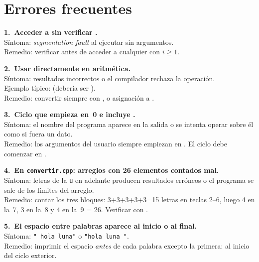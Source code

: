 \documentclass[12pt, oneside]{article}
\begin{document}
\section{Errores frecuentes}

\begin{notaprofesor}

  \textbf{1.\ Acceder a  sin verificar .}\\
  Síntoma: \textit{segmentation fault} al ejecutar sin argumentos.\\
  Remedio: verificar  antes de acceder a cualquier
   con $i \geq 1$.

  \vspace{0.5em}
  \textbf{2.\ Usar  directamente en aritmética.}\\
  Síntoma: resultados incorrectos o el compilador rechaza la operación.\\
  Ejemplo típico:  (debería ser
  ).\\
  Remedio: convertir siempre con ,  o asignación
  a .

  \vspace{0.5em}
  \textbf{3.\ Ciclo que empieza en~0 e incluye .}\\
  Síntoma: el nombre del programa aparece en la salida o se intenta
  operar sobre él como si fuera un dato.\\
  Remedio: los argumentos del usuario siempre empiezan en .
  El ciclo debe comenzar en .

  \vspace{0.5em}
  \textbf{4.\ En \texttt{convertir.cpp}: arreglos  con
  26 elementos contados mal.}\\
  Síntoma: letras de la \texttt{u} en adelante producen resultados
  erróneos o el programa se sale de los límites del arreglo.\\
  Remedio: contar los tres bloques: 3+3+3+3+3=15 letras en teclas
  2--6, luego 4 en la~7, 3 en la~8 y 4 en la~9 = 26.  Verificar
  con .

  \vspace{0.5em}
  \textbf{5.\ El espacio entre palabras aparece al inicio o al final.}\\
  Síntoma: \texttt{" hola luna"} o \texttt{"hola luna "}.\\
  Remedio: imprimir el espacio \textit{antes} de cada palabra excepto
  la primera:  al inicio del ciclo
  exterior.

\end{notaprofesor}
\end{document}
